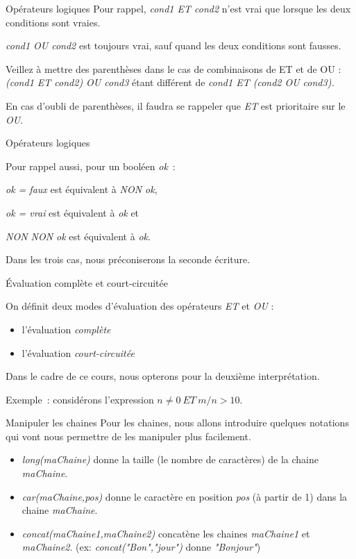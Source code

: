 \begin{frame}{Opérateurs logiques}
	Pour rappel, \textit{cond1 ET cond2} n’est vrai que lorsque
	les deux conditions sont vraies. 
	
	\bigskip
	
	\textit{cond1 OU cond2} est
	toujours vrai, sauf quand les deux conditions sont fausses.

	\bigskip
	
	Veillez à mettre des parenthèses dans le cas de combinaisons de ET et de
	OU : \textit{(cond1 ET cond2) OU cond3} étant différent de
	\textit{cond1 ET (cond2 OU cond3).} 
	
	En cas d'oubli de parenthèses, il faudra se rappeler que
	\textit{ET} est prioritaire sur le \textit{OU}.
\end{frame}

\begin{frame}{Opérateurs logiques}

	Pour rappel aussi, pour un booléen \textit{ok}~: 
	
	\textit{ok = faux} est équivalent à \textit{NON ok},
	
	\textit{ok = vrai} est équivalent à \textit{ok} et 
	
	\textit{NON NON ok} est équivalent à \textit{ok}.
	
	Dans les trois cas, nous préconiserons la seconde écriture.
\end{frame}

\begin{frame}{Évaluation complète et court-circuitée}

	On définit deux modes d’évaluation des opérateurs \textit{ET}
	et \textit{OU} :

	\begin{itemize}
	\item{l’évaluation \textit{complète}}
	\item{l’évaluation \textit{court-circuitée}}
	\end{itemize}
	Dans le cadre de ce cours, nous opterons pour la deuxième 
	interprétation.
	
	\bigskip
	
	Exemple~: considérons	l’expression 
		{$n {\neq} 0 \ ET \  m/n > 10$}.
\end{frame}
		
\begin{frame}{Manipuler les chaines}
	Pour les chaines, nous allons introduire quelques notations
	qui vont nous permettre de les manipuler plus facilement.

	\begin{itemize}
	\item \textit{long(maChaine)}
		donne la taille (le nombre de caractères) de la chaine 
		\textit{maChaine}.
	\item \textit{car(maChaine,pos)}
		donne le caractère en position \textit{pos} 
		(à partir de 1) dans la chaine \textit{maChaine}.
	\item \textit{concat(maChaine1,maChaine2)}
		concatène les chaines \textit{maChaine1} 
		et \textit{maChaine2}.
		(ex: \textit{concat("Bon","jour")} donne \textit{"Bonjour"})
	\end{itemize}
\end{frame}

